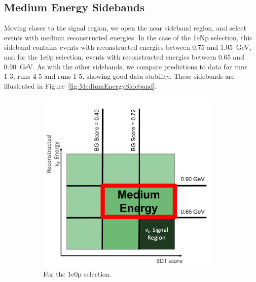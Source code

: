 \subsection{Medium Energy Sidebands}
\label{sec:MediumEnergySidebands}

Moving closer to the signal region, we open the near sideband region, and select events with medium reconstructed energies. In the case of the 1eNp selection, this sideband contains events with reconstructed energies between 0.75 and 1.05~GeV, and for the 1e0p selection, events with reconstructed energies between 0.65 and 0.90~GeV. As with the other sidebands, we compare predictions to data for runs 1-3, runs 4-5 and runs 1-5, showing good data stability. These sidebands are illustrated in Figure~\ref{fig:MediumEnergySideband}.

\begin{figure}[H]
    \centering
    \begin{subfigure}{0.5\linewidth}
        \includegraphics[width=\linewidth]{technote/Sidebands/Figures/NearSideband/ZpMediumEnergySideband.pdf}
        \caption{For the 1e0p selection.}
    \end{subfigure}%
    \begin{subfigure}{0.5\linewidth}

\end{subfigure}
\end{figure}
